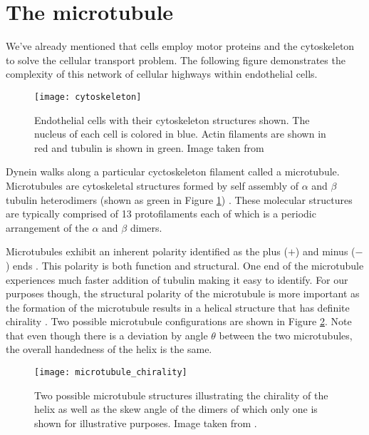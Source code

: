\section{The microtubule}
We've already mentioned that cells employ motor proteins and the cytoskeleton to solve the cellular transport problem. The following figure demonstrates the complexity of this network of cellular highways within endothelial cells. 
\begin{figure}[!hbt]
	\centering
	\texttt{[image: cytoskeleton]}
	\caption[The cytoskeleton]{Endothelial cells with their cytoskeleton structures shown. The nucleus of each cell is colored in blue. Actin filaments are shown in red and tubulin is shown in green. Image taken from \cite{cytoskeleton}}
	\label{fig:cytoskeleton}
\end{figure}

Dynein walks along a particular cyctoskeleton filament called a microtubule. Microtubules are cytoskeletal structures formed by self assembly of $\alpha$ and $\beta$ tubulin heterodimers (shown as green in Figure \ref{fig:cytoskeleton}) \cite{downing1998tubulin}. These molecular structures are typically comprised of 13 protofilaments each of which is a periodic arrangement of the $\alpha$ and $\beta$ dimers. 

Microtubules exhibit an inherent polarity identified as the plus ($+$) and minus ($-$) ends \cite{berk2000molecular}. This polarity is both function and structural. One end of the microtubule experiences much faster addition of tubulin making it easy to identify\cite{heidemann1980visualization}. For our purposes though, the structural polarity of the microtubule is more important as the formation of the microtubule results in a helical structure that has definite chirality \cite{hunyadi2007microtubule}. Two possible microtubule configurations are shown in Figure \ref{fig:chirality}. Note that even though there is a deviation by angle $\theta$ between the two microtubules, the overall handedness of the helix is the same. 

\begin{figure}[!hbt]
	\centering 
	\texttt{[image: microtubule\_chirality]}
	\caption[Motor protein structures]{Two possible microtubule structures illustrating the chirality of the helix as well as the skew angle of the dimers of which only one is shown for illustrative purposes. Image taken from \cite{hunyadi2007microtubule}.}
	\label{fig:chirality}
\end{figure}

